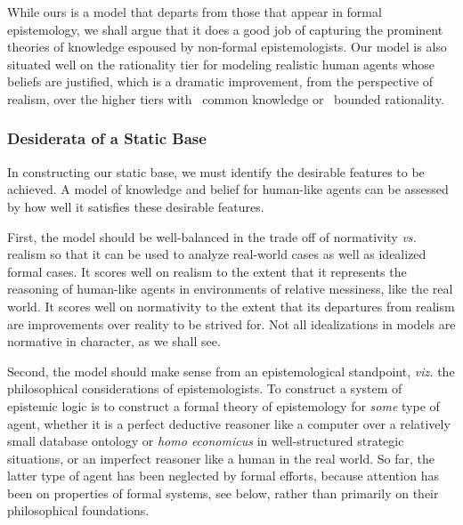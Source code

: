 
While ours is a model that departs from those that appear in formal epistemology, we shall argue that it does a good job of capturing the prominent theories of knowledge espoused by non-formal epistemologists. Our model is also situated well on the rationality tier for modeling realistic human agents whose beliefs are justified, which is a dramatic improvement, from the perspective of realism, over the higher tiers with \SFive\ common knowledge or \SFive\ bounded rationality.

\subsubsection{Desiderata of a Static Base}
In constructing our static base, we must identify the desirable features to be achieved. A model of knowledge and belief for human-like agents can be assessed by how well it satisfies these desirable features. 

First, the model should be well-balanced in the trade off of normativity \emph{vs.} realism so that it can be used to analyze real-world cases as well as idealized formal cases. It scores well on realism to the extent that it represents the reasoning of human-like agents in environments of relative messiness, like the real world. It scores well on normativity to the extent that its departures from realism are improvements over reality to be strived for. Not all idealizations in models are normative in character, as we shall see.

Second, the model should make sense from an epistemological standpoint, \emph{viz.} the philosophical considerations of epistemologists. To construct a system of epistemic logic is to construct a formal theory of epistemology for \emph{some} type of agent, whether it is a perfect deductive reasoner like a computer over a relatively small database ontology or \emph{homo economicus} in well-structured strategic situations, or an imperfect reasoner like a human in the real world. So far, the latter type of agent has been neglected by formal efforts, because attention has been on properties of formal systems, see below, rather than primarily on their philosophical foundations. 

